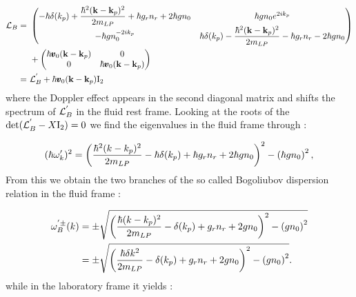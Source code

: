 \begin{equation}
    \begin{aligned}
    \mathcal{L}_B = \ &
    \begin{pmatrix}
        -\hbar\delta(k_p)+\dfrac{\hbar^2(\mathbf{k}-\mathbf{k}_p)^2}{2m_{LP}}+\hbar g_rn_r + 2\hbar g n_0 &  \hbar g n_0e^{2ik_p} \\
        -\hbar g n_0^{-2ik_p} & \hbar\delta(k_p)-\dfrac{\hbar^2(\mathbf{k}-\mathbf{k}_p)^2}{2m_{LP}}-\hbar g_rn_r - 2\hbar g n_0
    \end{pmatrix}\\
    &+\begin{pmatrix}
        \hbar \pmb{v}_0(\mathbf{k}-\mathbf{k}_p) & 0 \\
        0 & \hbar \pmb{v}_0(\mathbf{k}-\mathbf{k}_p)
    \end{pmatrix}\\
    = \ &\mathcal{L}_B^{'} + \hbar \pmb{v}_0(\mathbf{k}-\mathbf{k}_p)\mathrm{I_2}
    \end{aligned}
\end{equation}
where the Doppler effect appears in the second diagonal matrix and shifts the spectrum of $\mathcal{L}_B^{'}$ in the fluid rest frame. 
Looking at the roots of the $\mathrm{det}(\mathcal{L}_B^{'}-X\mathrm{I_2})=0$ we find the eigenvalues in the fluid frame through :

\begin{equation}
    (\hbar\omega'_k)^2 = \left(\dfrac{\hbar^2(k-k_p)^2}{2m_{LP}}-\hbar\delta(k_p)+\hbar g_rn_r +2\hbar g n_0\right)^2 - \left(\hbar g n_0\right)^2,
\end{equation}
From this we obtain the two branches of the so called Bogoliubov dispersion relation in the fluid frame :

\begin{equation}
    \begin{aligned}
    \omega^{'\pm}_B(k)&=\pm\sqrt{\left(\dfrac{\hbar(k-k_p)^2}{2m_{LP}}-\delta(k_p)+ g_rn_r +2g n_0\right)^2 - \left(g n_0\right)^2} \\
    &=\pm\sqrt{\left(\dfrac{\hbar \delta k^2}{2m_{LP}}-\delta(k_p)+ g_rn_r +2g n_0\right)^2 - \left(g n_0\right)^2}.
    \end{aligned}
\end{equation}
while in the laboratory frame it yields :

